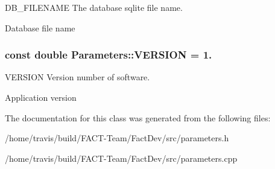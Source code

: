 D\-B\-\_\-\-F\-I\-L\-E\-N\-A\-M\-E The database sqlite file name. 

Database file name \hypertarget{classParameters_a279ee24140c761de46178daa8960bdc8}{
\subsubsection[{V\-E\-R\-S\-I\-O\-N}]{\setlength{\rightskip}{0pt plus 5cm}const double Parameters\-::\-V\-E\-R\-S\-I\-O\-N = 1.\hspace{0.3cm}{\ttfamily [static]}}}\label{classParameters_a279ee24140c761de46178daa8960bdc8}


V\-E\-R\-S\-I\-O\-N Version number of software. 

Application version 

The documentation for this class was generated from the following files\-:\begin{DoxyCompactItemize}
\item 
/home/travis/build/\-F\-A\-C\-T-\/\-Team/\-Fact\-Dev/src/parameters.\-h\item 
/home/travis/build/\-F\-A\-C\-T-\/\-Team/\-Fact\-Dev/src/parameters.\-cpp\end{DoxyCompactItemize}
